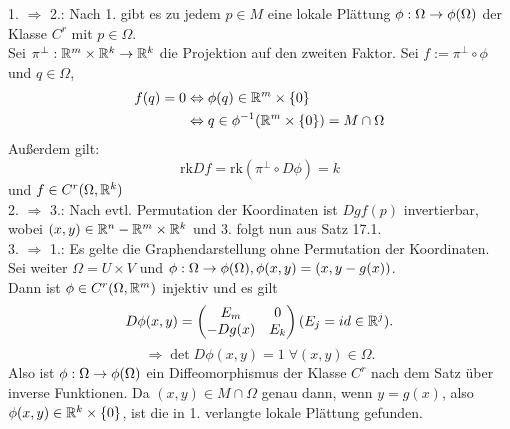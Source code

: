 \documentclass[../ana2u.tex]{subfiles}
\begin{document}
\begin{bew}
    1. \( \Rightarrow \) 2.: Nach 1. gibt es zu jedem \( p \in M \) 
    eine lokale Plättung \( \phi:\Omega\rightarrow \phi(\Omega) \) der Klasse 
    \( C^r \) mit \( p \in \Omega \).\\
    Sei \(\pi^\bot:\mathbb{R}^m \times \mathbb{R}^k\rightarrow \mathbb{R}^k\) die Projektion auf den 
    zweiten Faktor. Sei \( f := \pi^\bot \circ \phi \) und \( q \in \Omega \),
    \begin{align*}
        f(q) = 0 &\Leftrightarrow \phi(q) \in \mathbb{R}^m \times \{0\}\\
        &\Leftrightarrow q \in \phi^{-1}(\mathbb{R}^m \times \{0\}) = M \cap \Omega
    \end{align*}
    Außerdem gilt: 
    \[ \mathrm{rk} Df = \mathrm{rk}(\pi^\bot \circ D\phi) = k \]
    und \(f \in C^r(\Omega, \mathbb{R}^k)\) \\
    2. \( \Rightarrow \) 3.: Nach evtl. Permutation der Koordinaten 
    ist \( Dg f(p) \) invertierbar, wobei \( (x,y) \in \mathbb{R}^n - \mathbb{R}^m \times \mathbb{R}^k \) 
    und 3. folgt nun aus Satz 17.1.\\
    3. \( \Rightarrow \) 1.: Es gelte die Graphendarstellung 
    ohne Permutation der Koordinaten. Sei weiter \( \Omega = U \times V \) und 
    \( \phi:\Omega\rightarrow \phi(\Omega), 
    \phi(x,y) = (x, y - g(x)) \).\\
    Dann ist \( \phi \in C^r(\Omega, \mathbb{R}^m) \) injektiv 
    und es gilt 
    \[ D\phi(x,y) = \begin{pmatrix}
        E_m & 0 \\
        -Dg(x) & E_k
    \end{pmatrix} (E_j = id \in \mathbb{R}^j). \]
    \[ \Rightarrow \det D\phi(x,y) = 1 \;\forall (x,y) \in \Omega. \]
    Also ist \(\phi:\Omega\rightarrow \phi(\Omega) \) ein Diffeomorphismus
    der Klasse \(C^r\) nach dem Satz über inverse Funktionen. 
    Da \((x,y) \in M \cap \Omega\) genau dann, wenn \(y = g(x)\),
    also \(\phi(x,y) \in \mathbb{R}^k \times \{0\}\), ist die in 1. verlangte
    lokale Plättung gefunden.
\end{bew}
\end{document}
